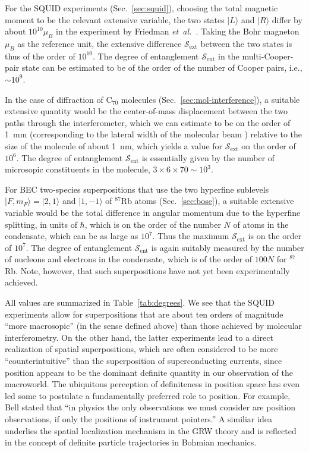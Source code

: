 \documentclass[twocolumn,aps,floatfix,amsmath,amssymb,showpacs,nofootinbib]{revtex4}
\newcommand{\etal}{\emph{et~al.\ }}
\newcommand{\ket}[1]{\ensuremath{|{#1\rangle}}}
\begin{document}
For the SQUID experiments (Sec.~\ref{sec:squid}), choosing the total
magnetic moment to be the relevant extensive variable, the two states
$\ket{L}$ and $\ket{R}$ differ by about $10^{10} \mu_B$ in the
experiment by Friedman \etal \cite{Friedman:2000:rr}. Taking the Bohr
magneton $\mu_B$ as the reference unit, the extensive difference
$\mathcal{S}_\text{ext}$ between the two states is thus of the order
of $10^{10}$. The degree of entanglement $\mathcal{S}_\text{ent}$ in
the multi-Cooper-pair state can be estimated to be of the order of the
number of Cooper pairs, i.e., $\sim 10^9$.

In the case of diffraction of C$_{70}$ molecules
(Sec.~\ref{sec:mol-interference}), a suitable extensive quantity would
be the center-of-mass displacement between the two paths through the
interferometer, which we can estimate to be on the order of 1~mm
(corresponding to the lateral width of the molecular beam
\cite{Hackermuller:2003:uu}) relative to the size of the molecule of
about 1~nm, which yields a value for $\mathcal{S}_\text{ext}$ on the
order of $10^6$. The degree of entanglement $\mathcal{S}_\text{ent}$
is essentially given by the number of microsopic constituents in the
molecule, $3 \times 6 \times 70 \sim 10^3$.

For BEC two-species superpositions that use the two hyperfine
sublevels $\ket{F,m_F} = \ket{2,1}$ and $\ket{1,-1}$ of $^{87}$Rb
atoms (Sec.~\ref{sec:bose}), a suitable extensive variable would be
the total difference in angular momentum due to the hyperfine
splitting, in units of $\hbar$, which is on the order of the number
$N$ of atoms in the condensate, which can be as large as $10^7$. Thus
the maximum $\mathcal{S}_\text{ext}$ is on the order of $10^7$. The
degree of entanglement $\mathcal{S}_\text{ent}$ is again suitably
measured by the number of nucleons and electrons in the condensate,
which is of the order of $100N$ for $^{87}$Rb. Note, however, that
such superpositions have not yet been experimentally achieved.
   
All values are summarized in Table~\ref{tab:degrees}. We see that the
SQUID experiments allow for superpositions that are about ten orders
of magnitude ``more macrosopic'' (in the sense defined above) than
those achieved by molecular interferometry. On the other hand, the
latter experiments lead to a direct realization of spatial
superpositions, which are often considered to be more
``counterintuitive'' than the superposition of superconducting
currents, since position appears to be the dominant definite quantity
in our observation of the macroworld. The ubiquitous perception of
definiteness in position space has even led some to postulate a
fundamentally preferred role to position. For example, Bell
\cite{Bell:1982:ag} stated that ``in physics the only observations we
must consider are position observations, if only the positions of
instrument pointers.'' A similiar idea underlies the spatial
localization mechanism in the GRW theory and is reflected in the
concept of definite particle trajectories in Bohmian mechanics.
\end{document}
